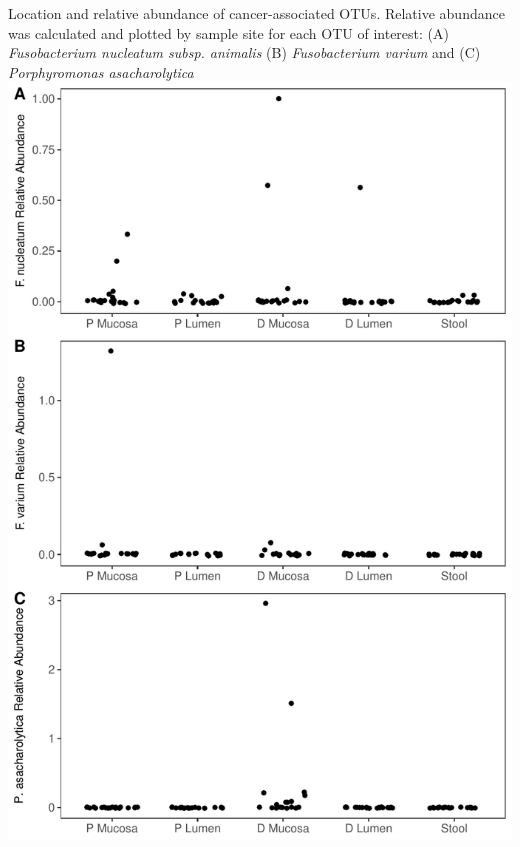 \documentclass[12pt,]{article}
\begin{document}
Location and relative abundance of cancer-associated OTUs. Relative
abundance was calculated and plotted by sample site for each OTU of
interest: (A) \emph{Fusobacterium nucleatum subsp. animalis} (B)
\emph{Fusobacterium varium} and (C) \emph{Porphyromonas asacharolytica}
\includegraphics{../submission/figure_S1.pdf}

\newpage
\end{document}
